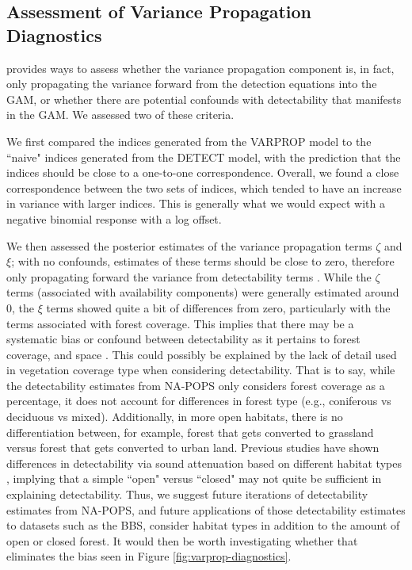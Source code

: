 \documentclass[12pt]{article}
\begin{document}
\subsection{Assessment of Variance Propagation Diagnostics}

\par \citet{bravington_variance_2021} provides ways to assess whether the variance propagation component is, in fact, only propagating the variance forward from the detection equations into the GAM, or whether there are potential confounds with detectability that manifests in the GAM.
We assessed two of these criteria.

We first compared the indices generated from the VARPROP model to the ``naive" indices generated from the DETECT model, with the prediction that the indices should be close to a one-to-one correspondence.
Overall, we found a close correspondence between the two sets of indices, which tended to have an increase in variance with larger indices.
This is generally what we would expect with a negative binomial response with a log offset.

We then assessed the posterior estimates of the variance propagation terms $\zeta$ and $\xi$; with no confounds, estimates of these terms should be close to zero, therefore only propagating forward the variance from detectability terms \citep{bravington_variance_2021}.
While the $\zeta$ terms (associated with availability components) were generally estimated around 0, the $\xi$ terms showed quite a bit of differences from zero, particularly with the terms associated with forest coverage.
This implies that there may be a systematic bias or confound between detectability as it pertains to forest coverage, and space \citep{bravington_variance_2021}.
This could possibly be explained by the lack of detail used in vegetation coverage type when considering detectability.
That is to say, while the detectability estimates from NA-POPS only considers forest coverage as a percentage, it does not account for differences in forest type (e.g., coniferous vs deciduous vs mixed).
Additionally, in more open habitats, there is no differentiation between, for example, forest that gets converted to grassland versus forest that gets converted to urban land.
Previous studies have shown differences in detectability via sound attenuation based on different habitat types \citep{schieck_biased_1997}, implying that a simple ``open" versus ``closed" may not quite be sufficient in explaining detectability.
Thus, we suggest future iterations of detectability estimates from NA-POPS, and future applications of those detectability estimates to datasets such as the BBS, consider habitat types in addition to the amount of open or closed forest.
It would then be worth investigating whether that eliminates the bias seen in Figure \ref{fig:varprop-diagnostics}.
\end{document}
